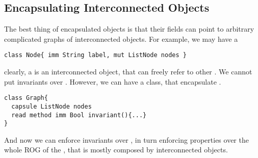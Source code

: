 \subsection{Encapsulating Interconnected Objects}
\saveSpace
The best thing of encapsulated objects is that their \Q@capsule@ fields can point to 
arbitrary complicated graphs of interconnected objects.
For example, we may have a 
\begin{lstlisting}
class Node{ imm String label, mut ListNode nodes }
\end{lstlisting}
clearly, a \Q@Node@ is an interconnected object, that can freely refer to other \Q@Node@s.
We cannot put invariants over \Q@Node@s.
However, we can have a \Q@Graph@ class, that encapsulate \Q@Node@s.

\begin{lstlisting}
class Graph{
  capsule ListNode nodes
  read method imm Bool invariant(){...}
}
\end{lstlisting}

And now we can enforce invariants over \Q@Graph@s, in turn enforcing properties over the
whole ROG of the \Q@Graph@, that is mostly composed by interconnected \Q@Node@s objects.